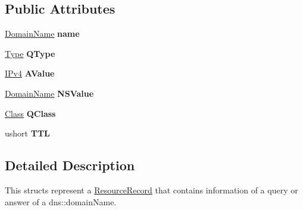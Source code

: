 \subsection*{Public Attributes}
\begin{DoxyCompactItemize}
\item 
\hyperlink{structdns_1_1DomainName}{Domain\+Name} {\bfseries name}\hypertarget{structdns_1_1ResourceRecord_ad0df62525540c1e2a9dcfc6b08e938bc}{}\label{structdns_1_1ResourceRecord_ad0df62525540c1e2a9dcfc6b08e938bc}

\item 
\hyperlink{namespacedns_a2f53daa27510b0ea61122af921bb66c7}{Type} {\bfseries Q\+Type}\hypertarget{structdns_1_1ResourceRecord_a16b19c9f45bfd089ef50089eda442076}{}\label{structdns_1_1ResourceRecord_a16b19c9f45bfd089ef50089eda442076}

\item 
\hyperlink{structIPv4}{I\+Pv4} {\bfseries A\+Value}\hypertarget{structdns_1_1ResourceRecord_a1c93ffe71aba5a8893f38a08fdec766f}{}\label{structdns_1_1ResourceRecord_a1c93ffe71aba5a8893f38a08fdec766f}

\item 
\hyperlink{structdns_1_1DomainName}{Domain\+Name} {\bfseries N\+S\+Value}\hypertarget{structdns_1_1ResourceRecord_a66c5d870f1a6328e6e1c26845102be6a}{}\label{structdns_1_1ResourceRecord_a66c5d870f1a6328e6e1c26845102be6a}

\item 
\hyperlink{namespacedns_a90321cc8e6ade0bea4be3fee56d3cef2}{Class} {\bfseries Q\+Class}\hypertarget{structdns_1_1ResourceRecord_a08dc70151680f4d765e9ce3896352154}{}\label{structdns_1_1ResourceRecord_a08dc70151680f4d765e9ce3896352154}

\item 
ushort {\bfseries T\+TL}\hypertarget{structdns_1_1ResourceRecord_a7c540bed9cace85ce331bf596a6827e4}{}\label{structdns_1_1ResourceRecord_a7c540bed9cace85ce331bf596a6827e4}

\end{DoxyCompactItemize}


\subsection{Detailed Description}
This structs represent a \hyperlink{structdns_1_1ResourceRecord}{Resource\+Record} that contains information of a query or answer of a dns\+::domain\+Name. 

